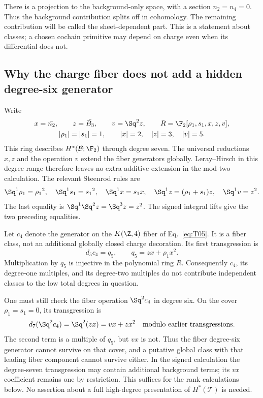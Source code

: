 There is a projection to the background-only space, with a section ${n_2}={n_4}=0$. Thus the background contribution splits off in cohomology. The remaining contribution will be called the sheet-dependent part. This is a statement about classes; a chosen cochain primitive may depend on charge even when its differential does not.


\subsection{Why the charge fiber does not add a hidden degree-six generator}
Write
\begin{equation}\label{eq:R05}
 \begin{gathered}
 x=\bar {n_2},\qquad z=\bar {B_3},\qquad v=\Sq^2z,
 \qquad R=\F_2[{\rho_1},{s_1},x,z,v],\\
 |{\rho_1}|=|{s_1}|=1,\qquad |x|=2,\quad |z|=3,\quad |v|=5.
 \end{gathered}
\end{equation}
This ring describes $H^*(\mathcal B;\F_2)$ through degree seven. The universal reductions $x,z$ and the operation $v$ extend the fiber generators globally. Leray--Hirsch in this degree range therefore leaves no extra additive extension in the mod-two calculation. The relevant Steenrod rules are
\begin{equation}\label{eq:sqone05}
 \Sq^1{\rho_1}={\rho_1}^2,\quad\Sq^1{s_1}={s_1}^2,\quad
 \Sq^1x={s_1}x,\quad\Sq^1z=(\rho_1+s_1)z,\quad\Sq^1v=z^2.
\end{equation}
The last equality is $\Sq^1\Sq^2z=\Sq^3z=z^2$. The signed integral lifts give the two preceding equalities.

Let $c_4$ denote the generator on the $K(\Z,4)$ fiber of Eq.~\eqref{eq:T05}. It is a fiber class, not an additional globally closed charge decoration. Its first transgression is
\begin{equation}
 d_5 c_4=q_5,
 \qquad q_5=zx+{\rho_1}x^2.
\end{equation}
Multiplication by $q_5$ is injective in the polynomial ring $R$. Consequently $c_4$, its degree-one multiples, and its degree-two multiples do not contribute independent classes to the low total degrees in question.

One must still check the fiber operation $\Sq^2c_4$ in degree six. On the cover ${\rho_1}={s_1}=0$, its transgression is
\begin{equation}\label{eq:charge-transgression05}
 d_7(\Sq^2c_4)=\Sq^2(zx)=vx+zx^2
 \quad\text{modulo earlier transgressions}.
\end{equation}
The second term is a multiple of $q_5$, but $vx$ is not. Thus the fiber degree-six generator cannot survive on that cover, and a putative global class with that leading fiber component cannot survive either. In the signed calculation the degree-seven transgression may contain additional background terms; its $vx$ coefficient remains one by restriction. This suffices for the rank calculations below. No assertion about a full high-degree presentation of $H^*(\mathcal T)$ is needed.

